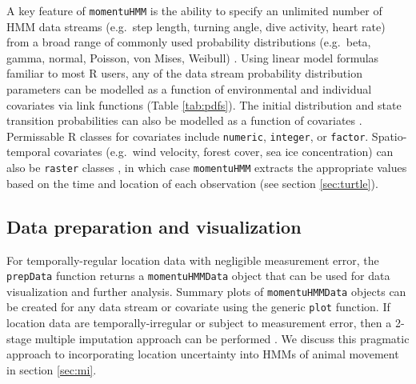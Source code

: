 \documentclass[12pt]{article}\usepackage[]{graphicx}\usepackage[]{color}
\begin{document}
A key feature of \verb|momentuHMM| is the ability to specify an unlimited number of HMM data streams (e.g.\ step length, turning angle, dive activity, heart rate) from a broad range of commonly used probability distributions (e.g.\ beta, gamma, normal, Poisson, von Mises, Weibull)
. Using linear model formulas familiar to most R users, any of the data stream probability distribution parameters can be modelled as a function of environmental and individual covariates via link functions (Table \ref{tab:pdfs}). %
The initial distribution %
and state transition probabilities %
can also be modelled as a function of covariates%
. Permissable R classes for covariates include \verb|numeric|, \verb|integer|, or \verb|factor|. %
Spatio-temporal covariates (e.g.\ wind velocity, forest cover, sea ice concentration) can also be \verb|raster| classes \citep{Hijmans2016}, in which case \verb|momentuHMM| extracts the appropriate values based on the time and location of each observation (see section \ref{sec:turtle}).

\subsection{Data preparation and visualization}
For temporally-regular location data with negligible measurement error, the \verb|prepData| function returns a \verb|momentuHMMData| object that can be used for data visualization and further analysis. Summary plots of \verb|momentuHMMData| objects can be created for any data stream or covariate using the generic \verb|plot| function. If location data are temporally-irregular or subject to measurement error, then a 2-stage multiple imputation approach can be performed \citep{HootenEtAl2017,McClintock2017}. We discuss this pragmatic approach to incorporating location uncertainty into HMMs of animal movement in section \ref{sec:mi}.
\end{document}
